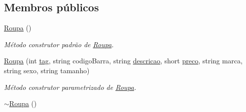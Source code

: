 \subsection*{Membros públicos}
\begin{DoxyCompactItemize}
\item 
\hypertarget{classRoupa_a0b8186c1c35089bebd88c8a3d0acf74b}{\hyperlink{classRoupa_a0b8186c1c35089bebd88c8a3d0acf74b}{Roupa} ()}\label{classRoupa_a0b8186c1c35089bebd88c8a3d0acf74b}

\begin{DoxyCompactList}\small\item\em Método construtor padrão de \hyperlink{classRoupa}{Roupa}. \end{DoxyCompactList}\item 
\hyperlink{classRoupa_aad1c967e981fd9605e0548432d035770}{Roupa} (int \hyperlink{classProduto_a76711f92305c825f07549734cd7c6ade}{tag}, string codigo\-Barra, string \hyperlink{classProduto_ab04a024e24feb7f79774e280356f6bc7}{descricao}, short \hyperlink{classProduto_a2ad13f91582fd70e878fc449c7b77171}{preco}, string marca, string sexo, string tamanho)
\begin{DoxyCompactList}\small\item\em Método construtor parametrizado de \hyperlink{classRoupa}{Roupa}. \end{DoxyCompactList}\item 
\hypertarget{classRoupa_af7d0589e854d5dfef94346856d417544}{\hyperlink{classRoupa_af7d0589e854d5dfef94346856d417544}{$\sim$\-Roupa} ()}\label{classRoupa_af7d0589e854d5dfef94346856d417544}


\end{DoxyCompactItemize}
